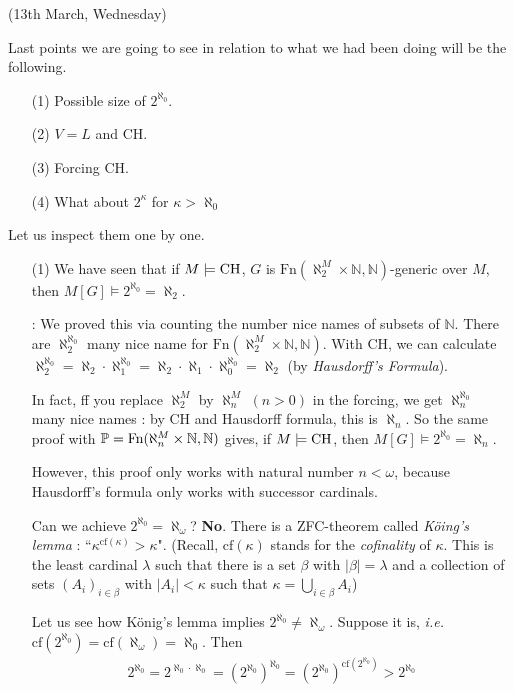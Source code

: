 \documentclass[12pt,a4paper]{article}
\newenvironment{subproof}
{\begin{changemargin}{0.5cm}{0.5cm} 
	}%
	{\end{changemargin}
}
\begin{document}
\newday

(13th March, Wednesday)
\s

Last points we are going to see in relation to what we had been doing will be the following. 
\begin{itemize}
\item[(1)] Possible size of $2^{\aleph_0}$.
\item[(2)] $V=L$ and CH.
\item[(3)] Forcing CH.
\item[(4)] What about $2^{\kappa}$ for $\kappa > \aleph_0$
\end{itemize}
\s

Let us inspect them one by one.
\begin{itemize}
\item[(1)] We have seen that if $M \models \text{CH}$, $G$ is $\text{Fn}(\aleph_2^M \times \mathbb{N}, \mathbb{N})$-generic over $M$, then $M[G] \models 2^{\aleph_0} = \aleph_2$.
\begin{subproof}
: We proved this via counting the number nice names of subsets of $\mathbb{N}$. There are $\aleph_2^{\aleph_0}$ many nice name for $\text{Fn}(\aleph_2^M \times \mathbb{N}, \mathbb{N})$. With CH, we can calculate $\aleph_2^{\aleph_0} = \aleph_2 \cdot \aleph_1^{\aleph_0} = \aleph_2 \cdot \aleph_1 \cdot \aleph_0^{\aleph_0} = \aleph_2$ (by \emph{Hausdorff's Formula}).
\end{subproof}
In fact, ff you replace $\aleph_2^M$ by $\aleph_n^M$ $(n>0)$ in the forcing, we get $\aleph_n^{\aleph_0}$ many nice names : by CH and Hausdorff formula, this is $\aleph_n$. So the same proof with $\mathbb{P} = \text{Fn}(\aleph_n^M \times \mathbb{N}, \mathbb{N})$ gives, if $M\models \text{CH}$, then $M[G] \models 2^{\aleph_0} =\aleph_n$.

\quad However, this proof only works with natural number $n< \omega$, because Hausdorff's formula only works with successor cardinals. 

\quad Can we achieve $2^{\aleph_0} = \aleph_{\omega}$? \textbf{No}. There is a ZFC-theorem called \emph{K\"oing's lemma} : ``$\kappa^{\text{cf}(\kappa)} > \kappa$". (Recall, $\text{cf}(\kappa)$ stands for the \emph{cofinality} of $\kappa$. This is the least cardinal $\lambda$ such that there is a set $\beta$ with $|\beta| = \lambda$ and a collection of sets $(A_i)_{i\in \beta}$ with $|A_i| < \kappa$ such that $\kappa = \bigcup_{i\in \beta} A_i$)

\quad Let us see how K\"onig's lemma implies $2^{\aleph_0} \neq \aleph_{\omega}$. Suppose it is, \textit{i.e.} $\text{cf}(2^{\aleph_0}) = \text{cf}(\aleph_{\omega}) = \aleph_0$. Then
\begin{align*}
2^{\aleph_0} = 2^{\aleph_0 \cdot \aleph_0} = (2^{\aleph_0})^{\aleph_0} = (2^{\aleph_0})^{\text{cf}(2^{\aleph_0})} > 2^{\aleph_0}
\end{align*}


\end{itemize}
\end{document}
